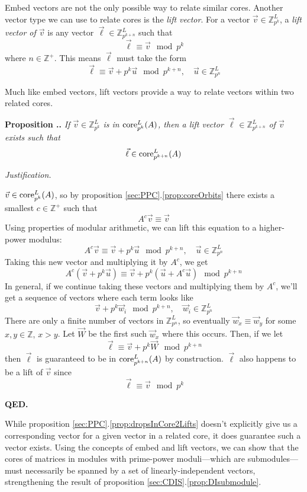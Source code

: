 \documentclass[a4paper, 12pt, reqno]{amsart}
\newcommand\core[3]{\textup{core}_{#1}^{#2}(#3)}
\newcounter{propcounter}[section]
\newenvironment{proposition}[1]
{
	\refstepcounter{propcounter}
	\textbf{Proposition \thesection.\thepropcounter.} \emph{#1}
	
	\emph{Justification.}
}
{
	\textbf{QED.} \\
}
\begin{document}
		Embed vectors are not the only possible way to relate similar cores. Another vector type we can use to relate cores is the \emph{lift vector}. For a vector 
		$\vec{v} \in \mathds{Z}_{p^k}^L$, a \emph{lift vector of $\vec{v}$} is any vector $\vec{\ell} \in \mathds{Z}_{p^{k+n}}^L$ such that
		\[
			\vec{\ell} \equiv \vec{v} \mod{p^k}
		\]
		where $n \in \mathds{Z}^+$. This means $\vec{\ell}$ must take the form
		\[
			\vec{\ell} \equiv \vec{v} + p^k\vec{u} \mod{p^{k+n}}, \quad \vec{u} \in \mathds{Z}_{p^n}^L
		\]
		
		Much like embed vectors, lift vectors provide a way to relate vectors within two related cores.
		
		\begin{proposition}{If $\vec{v} \in \mathds{Z}_{p^k}^L$ is in $\core{p^k}{L}{A}$, then a lift vector $\vec{\ell} \in \mathds{Z}_{p^{k+n}}^L$ of $\vec{v}$ exists
		such that
		\[
			\vec{\ell} \in \core{p^{k+n}}{L}{A}
		\]}
			\label{prop:dropsInCore2Lifts}
			$\vec{v} \in \core{p^k}{L}{A}$, so by proposition \ref{sec:PPC}.\ref{prop:coreOrbits} there exists a smallest $c \in \mathds{Z}^+$ such that
			\[
				A^c\vec{v} \equiv \vec{v}
			\]
			Using properties of modular arithmetic, we can lift this equation to a higher-power modulus:
			\[
				A^c\vec{v} \equiv \vec{v} + p^k\vec{u} \mod{p^{k+n}}, \quad \vec{u} \in \mathds{Z}_{p^n}^L
			\]
			Taking this new vector and multiplying it by $A^c$, we get
			\[
				A^c(\vec{v} + p^k\vec{u}) \equiv \vec{v} + p^k(\vec{u} + A^c\vec{u}) \mod{p^{k+n}}
			\]
			In general, if we continue taking these vectors and multiplying them by $A^c$, we'll get a sequence of vectors where each term looks like
			\[
				\vec{v} + p^k\vec{w}_i \mod{p^{k+n}}, \quad \vec{w}_i \in \mathds{Z}_{p^n}^L
			\]
			There are only a finite number of vectors in $\mathds{Z}_{p^n}^L$, so eventually $\vec{w}_x \equiv \vec{w}_y$ for some $x,y \in \mathds{Z},\, x > y$. Let 
			$\vec{W}$ be the first such $\vec{w}_x$ where this occurs. Then, if we let
			\[
				\vec{\ell} \equiv \vec{v} + p^k\vec{W} \mod{p^{k+n}}
			\]
			then $\vec{\ell}$ is guaranteed to be in $\core{p^{k+n}}{L}{A}$ by construction. $\vec{\ell}$ also happens to be a lift of $\vec{v}$ since
			\[
				\vec{\ell} \equiv \vec{v} \mod{p^k}
			\]
		\end{proposition}
		
		While proposition \ref{sec:PPC}.\ref{prop:dropsInCore2Lifts} doesn't explicitly give us a corresponding vector for a given vector in a related core, it does 
		guarantee such a vector exists. Using the concepts of embed and lift vectors, we can show that the cores of matrices in modules with prime-power moduli---which are 
		submodules---must necessarily be spanned by a set of linearly-independent vectors, strengthening the result of proposition \ref{sec:CDIS}.\ref{prop:DIsubmodule}.
		
\end{document}
